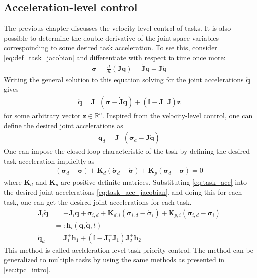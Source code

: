 \subsection{Acceleration-level control}

The previous chapter discusses the velocity-level control of tasks. It is also 
possible to determine the double derivative of the joint-space variables correspoinding to some
desired task acceleration. To see this, consider \autoref{eq:def_task_jacobian} and differentiate
with respect to time once more:
\begin{align}
    \ddot{\bm{\sigma}} = \frac{d}{dt}\left(\bm{J} \dot{\bm{q}}\right) = \dot{\bm{J}} \dot{\bm{q}} + \bm{J} \ddot{\bm{q}}
    \label{eq:task_acc_jacobian}
\end{align}
Writing the general solution to this equation solving for the joint accelerations
$\ddot{\bm{q}}$ gives
\begin{align}
    \ddot{\bm{q}} = \bm{J}^{+} \left(\ddot{\bm{\sigma}} - \dot{\bm{J}}\dot{\bm{q}}\right) +
    \left(\mathbb{I} - \bm{J}^{+}\bm{J}\right) \bm{z} \label{eq:task_acc_control}
\end{align}
for some arbitrary vector $\bm{z} \in \mathbb{R}^n$. Inspired from the
velocity-level control, one can define the desired joint accelerations as
\begin{align}
    \ddot{\bm{q}}_d = \bm{J}^{+} \left(\ddot{\bm{\sigma}}_d
    - \dot{\bm{J}}\dot{\bm{q}}\right) \label{eq:task_priority_acc}
\end{align}
One can impose the closed loop characteristic of the task by defining the desired
task acceleration implicitly as
\begin{align}
    \left(\ddot{\bm{\sigma}}_d - \ddot{\bm{\sigma}}\right) +
    \bm{K}_d\left(\dot{\bm{\sigma}}_d - \dot{\bm{\sigma}}\right) +
    \bm{K}_p\left(\bm{\sigma}_d - \bm{\sigma}\right) = 0 \label{eq:task_acc}
\end{align}
where $\bm{K}_d$ and $\bm{K}_p$ are positive definite matrices. Substituting
\autoref{eq:task_acc} into the desired joint accelerations \autoref{eq:task_acc_jacobian},
and doing this for each task, one can get the desired joint accelerations for each task.
\begin{subequations}
\begin{align}
    \bm{J}_i\ddot{\bm{q}} &= -\dot{\bm{J}}_i\dot{\bm{q}} + \ddot{\bm{\sigma}}_{i,d} 
    + \bm{K}_{d,i}\left(\dot{\bm{\sigma}}_{i,d} - \dot{\bm{\sigma}}_i\right)
    + \bm{K}_{p,i}\left(\bm{\sigma}_{i,d} - \bm{\sigma}_i\right) \\
    &=: \bm{h}_i(\bm{q}, \dot{\bm{q}}, t) \\
    \ddot{\bm{q}}_d &= \bm{J}_1^{+} \bm{h}_1 + \left(\mathbb{I} - \bm{J}_1^+\bm{J}_1\right) \bm{J}_2^{+} \bm{h}_2
\end{align}
\end{subequations}
This method is called accleleration-level task priority control. The method can
be generalized to multiple tasks by using the same methods as presented in \autoref{sec:tpc_intro}.

